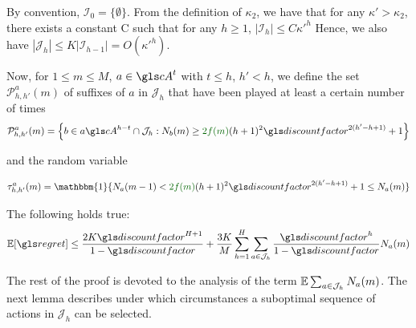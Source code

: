 By convention, $\mathcal{I}_0 = \{\emptyset\}$. From the definition of $\kappa_2$, we have that for any $\kappa'>\kappa_2$, there exists a constant C such that for any $h \geq 1$,
$|\mathcal{I}_h| \leq C {\kappa'}^h$
Hence, we also have $|\mathcal{J}_h| \leq K|\mathcal{I}_{h-1}| = O({\kappa'}^h)$.

Now, for $1\leq m \leq M$, $a \in \cA^t$ with $t \leq h$, $h'<h$, we define the set $\mathcal{P}^a_{h,h'}(m)$ of suffixes of $a$ in $\mathcal{J}_h$ that have been played at least a certain number of times
\begin{equation*}
\mathcal{P}^a_{h,h'}(m) = \left\{ b\in a \cA^{h-t}\cap \mathcal{J}_h : N_b(m) \geq \diff{2f(m)}(h+1)^2\discount^{2(h'-h+1)} + 1 \right\}
\end{equation*}

and the random variable

\begin{equation*}
\tau^a_{h,h'}(m) = \mathbbm{1}\{N_a(m-1) < \diff{2f(m)}(h+1)^2\discount^{2(h'-h+1)} + 1 \leq N_a(m)\}
\end{equation*}

\begin{lemma}
	\label{lemma:expected-regret}
	\begin{leftbar}[lemmabar]
	The following holds true:
	\begin{equation*}
	\expectedvalue [\regret] \leq \frac{2K \discount^{H+1}}{1-\discount} +\frac{3K}{M}\sum_{h=1}^H\sum_{a\in\mathcal{J}_h}\frac{\discount^h}{1-\discount}N_a(m)
	\end{equation*}
	\end{leftbar}
\end{lemma}


The rest of the proof is devoted to the analysis of the term $\operatorname*{\mathbb{E}} \sum_{a\in \mathcal{J}_h} N_a(m)$. The next lemma describes under which circumstances a suboptimal sequence of actions in $\mathcal{J}_h$ can be selected.

